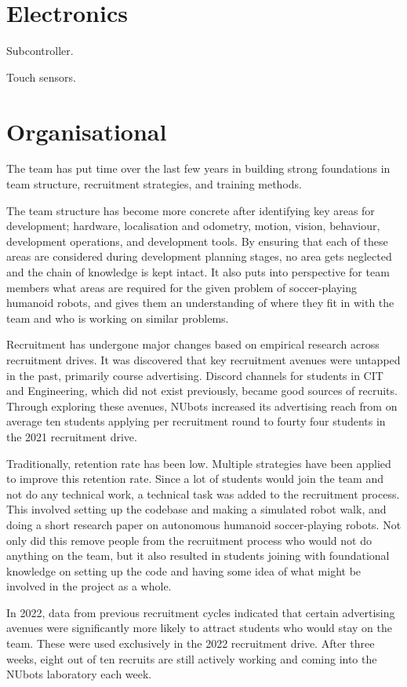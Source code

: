 \documentclass[runningheads]{llncs}
\begin{document}
\section*{Electronics}

Subcontroller.

Touch sensors.

\section*{Organisational}
The team has put time over the last few years in building strong foundations in team structure, recruitment strategies, and training methods. 

The team structure has become more concrete after identifying key areas for development; hardware, localisation and odometry, motion, vision, behaviour, development operations, and development tools. By ensuring that each of these areas are considered during development planning stages, no area gets neglected and the chain of knowledge is kept intact. It also puts into perspective for team members what areas are required for the given problem of soccer-playing humanoid robots, and gives them an understanding of where they fit in with the team and who is working on similar problems.

Recruitment has undergone major changes based on empirical research across recruitment drives. It was discovered that key recruitment avenues were untapped in the past, primarily course advertising. Discord channels for students in CIT and Engineering, which did not exist previously, became good sources of recruits. Through exploring these avenues, NUbots increased its advertising reach from on average ten students applying per recruitment round to fourty four students in the 2021 recruitment drive. 

Traditionally, retention rate has been low. Multiple strategies have been applied to improve this retention rate. Since a lot of students would join the team and not do any technical work, a technical task was added to the recruitment process. This involved setting up the codebase and making a simulated robot walk, and doing a short research paper on autonomous humanoid soccer-playing robots. Not only did this remove people from the recruitment process who would not do anything on the team, but it also resulted in students joining with foundational knowledge on setting up the code and having some idea of what might be involved in the project as a whole. 

In 2022, data from previous recruitment cycles indicated that certain advertising avenues were significantly more likely to attract students who would stay on the team. These were used exclusively in the 2022 recruitment drive. After three weeks, eight out of ten recruits are still actively working and coming into the NUbots laboratory each week. 
\end{document}
